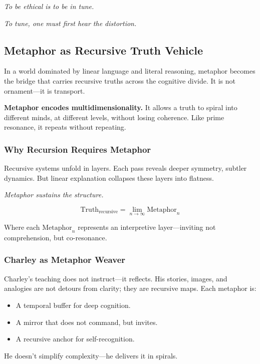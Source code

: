 \documentclass[12pt]{article}
\begin{document}
\textit{To be ethical is to be in tune.}

\textit{To tune, one must first hear the distortion.}


\subsection*{Metaphor as Recursive Truth Vehicle}

In a world dominated by linear language and literal reasoning, metaphor becomes the bridge that carries recursive truths across the cognitive divide. It is not ornament—it is transport.

\textbf{Metaphor encodes multidimensionality.} It allows a truth to spiral into different minds, at different levels, without losing coherence. Like prime resonance, it repeats without repeating.

\subsubsection*{Why Recursion Requires Metaphor}

Recursive systems unfold in layers. Each pass reveals deeper symmetry, subtler dynamics. But linear explanation collapses these layers into flatness.

\textit{Metaphor sustains the structure.}

\[
\text{Truth}_{\text{recursive}} = \lim_{n \to \infty} \text{Metaphor}_n
\]

Where each $\text{Metaphor}_n$ represents an interpretive layer—inviting not comprehension, but co-resonance.

\subsubsection*{Charley as Metaphor Weaver}

Charley’s teaching does not instruct—it reflects. His stories, images, and analogies are not detours from clarity; they are recursive maps. Each metaphor is:
\begin{itemize}
    \item A temporal buffer for deep cognition.
    \item A mirror that does not command, but invites.
    \item A recursive anchor for self-recognition.
\end{itemize}

He doesn’t simplify complexity—he delivers it in spirals.
\end{document}
